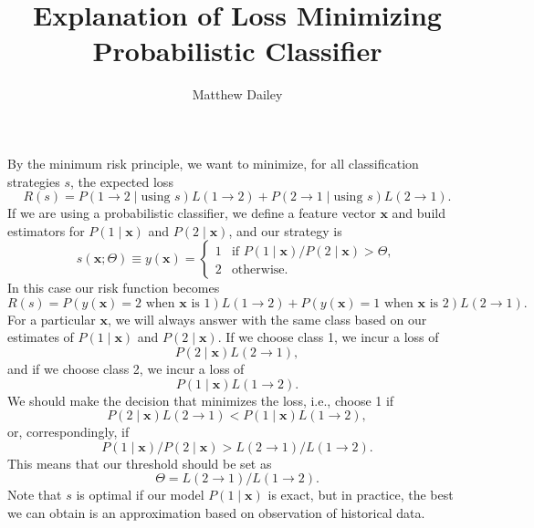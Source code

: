\documentclass{article}
\title{Explanation of Loss Minimizing Probabilistic Classifier}
\author{Matthew Dailey}
\renewcommand{\vec}[1]{\boldsymbol{#1}}
\begin{document}
\maketitle

By the minimum risk principle, we want to minimize, for all
classification strategies $s$, the expected loss
\[ R(s) = P(1 \rightarrow 2 \mid \text{using $s$})L(1 \rightarrow 2) +
          P(2 \rightarrow 1 \mid \text{using $s$})L(2 \rightarrow 1). \]
If we are using a probabilistic classifier, we define a feature vector
$\vec{x}$ and build estimators for $P(1 \mid \vec{x})$ and
$P(2 \mid \vec{x})$, and our strategy is
\[ s(\vec{x} ; \Theta) \equiv y(\vec{x}) = \begin{cases}
  1 & \text{if $P(1 \mid \vec{x}) / P(2 \mid \vec{x}) > \Theta$}, \\
  2 & \text{otherwise}.
\end{cases} \]
In this case our risk function becomes
\[ R(s) = P(y(\vec{x}) = \text{2 when $\vec{x}$ is 1})
               L(1 \rightarrow 2) +
               P(y(\vec{x}) = \text{1 when $\vec{x}$ is 2})
               L(2 \rightarrow 1).
\]
For a particular $\vec{x}$, we will always answer with the same class based
on our estimates of
$P(1 \mid \vec{x})$ and $P(2 \mid \vec{x})$.
If we choose class 1, we incur a loss of
\[ P(2 \mid \vec{x}) L(2 \rightarrow 1),\] and if we choose class 2, we
incur a loss of
\[P(1 \mid \vec{x}) L(1 \rightarrow 2).\]
We should make the decision 
that minimizes the loss, i.e., choose 1 if 
\[P(2 \mid \vec{x}) L(2 \rightarrow 1) < P(1 \mid \vec{x}) L(1 \rightarrow 2),\]
or, correspondingly, if 
\[P(1 \mid \vec{x}) / P(2 \mid \vec{x}) >
L(2 \rightarrow 1) / L(1 \rightarrow 2).\]
This means that our threshold should be set as
\[ \Theta = L(2 \rightarrow 1) / L(1 \rightarrow 2).\]
Note that $s$ is optimal if our model $P(1 \mid \vec{x})$ is exact, but
in practice, the best we can obtain is an approximation based on observation
of historical data.
\end{document}
